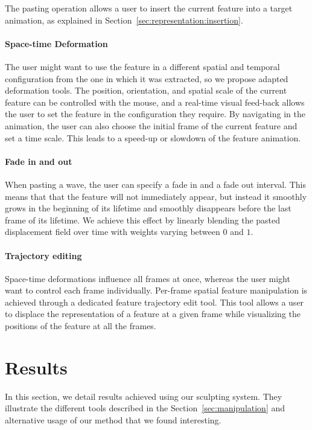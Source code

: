 The pasting operation allows a user to insert the current feature into a target animation, as explained in Section~\ref{sec:representation:insertion}.

\paragraph{Space-time Deformation}

The user might want to use the feature in a different spatial and temporal configuration from the one in which it was extracted, so we propose adapted deformation tools.
The position, orientation, and spatial scale of the current feature can be controlled with the mouse, and a real-time visual feed-back allows the user to set the feature in the configuration they require. 
By navigating in the animation, the user can also choose the initial frame of the current feature and set a time scale. 
This leads to a speed-up or slowdown of the feature animation.

\paragraph{Fade in and out}

When pasting a wave, the user can specify a fade in and a fade out interval. 
This means that that the feature will not immediately appear, but instead it smoothly grows in the beginning of its lifetime and smoothly disappears before the last frame of its lifetime. 
We achieve this effect by linearly blending the pasted displacement field over time with weights varying between $0$ and $1$.

\paragraph{Trajectory editing}

Space-time deformations influence all frames at once, whereas the user might want to control each frame individually.
Per-frame spatial feature manipulation is achieved through a dedicated feature trajectory edit tool.
This tool allows a user to displace the representation of a feature at a given frame while visualizing the positions of the feature at all the frames.

\section{Results} \label{sec:fluidsculpting:results}
In this section, we detail results achieved using our sculpting system.
They illustrate the different tools described in the Section~\ref{sec:manipulation} and alternative usage of our method that we found interesting.

